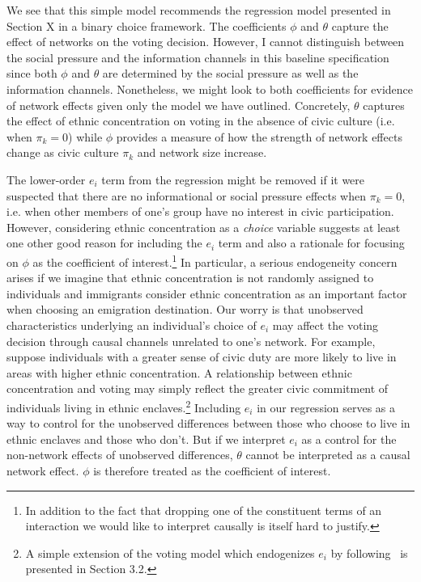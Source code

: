 \documentclass[11pt, oneside]{article}   	%
\begin{document}
We see that this simple model recommends the regression model presented in Section X in a binary choice framework. The coefficients $\phi$ and $\theta$ capture the effect of networks on the voting decision. However, I cannot distinguish between the social pressure and the information channels in this baseline specification since both $\phi$ and $\theta$ are determined by the social pressure as well as the information channels. Nonetheless, we might look to both coefficients for evidence of network effects given only the model we have outlined. Concretely, $\theta$ captures the effect of ethnic concentration on voting in the absence of civic culture (i.e. when $\pi_k=0$) while $\phi$ provides a measure of how the strength of network effects change as civic culture $\pi_k$ and network size increase. 

The lower-order $e_i$ term from the regression might be removed if it were suspected that there are no informational or social pressure effects when $\pi_k=0$, i.e. when other members of one's group have no interest in civic participation. However, considering ethnic concentration as a \emph{choice} variable suggests at least one other good reason for including the $e_i$ term and also a rationale for focusing on $\phi$ as the coefficient of interest.\footnote{In addition to the fact that dropping one of the constituent terms of an interaction we would like to interpret causally is itself hard to justify.} In particular, a serious endogeneity concern arises if we imagine that ethnic concentration is not randomly assigned to individuals and immigrants consider ethnic concentration as an important factor when choosing an emigration destination. Our worry is that unobserved characteristics underlying an individual's choice of $e_i$ may affect the voting decision through causal channels unrelated to one's network. For example, suppose individuals with a greater sense of civic duty are more likely to live in areas with higher ethnic concentration. A relationship between ethnic concentration and voting may simply reflect the greater civic commitment of individuals living in ethnic enclaves.\footnote{A simple extension of the voting model which  endogenizes $e_i$ by following~\cite{Edin2003} is presented in Section 3.2.} Including $e_i$ in our regression serves as a way to control for the unobserved differences between those who choose to live in ethnic enclaves and those who don't. But if we interpret $e_i$ as a control for the non-network effects of unobserved differences, $\theta$ cannot be interpreted as a causal network effect. $\phi$ is therefore treated as the coefficient of interest.
\end{document}
